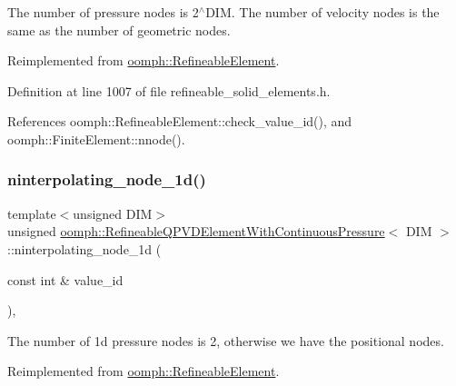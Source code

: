 The number of pressure nodes is 2$^\wedge$\+D\+IM. The number of velocity nodes is the same as the number of geometric nodes. 



Reimplemented from \hyperlink{classoomph_1_1RefineableElement_a8b1b5031b55141567ba24913a21534f4}{oomph\+::\+Refineable\+Element}.



Definition at line 1007 of file refineable\+\_\+solid\+\_\+elements.\+h.



References oomph\+::\+Refineable\+Element\+::check\+\_\+value\+\_\+id(), and oomph\+::\+Finite\+Element\+::nnode().

\mbox{\label{classoomph_1_1RefineableQPVDElementWithContinuousPressure_a9b38f35f3251638b00e5b095f0294e07}} 
\subsubsection{\texorpdfstring{ninterpolating\+\_\+node\+\_\+1d()}{ninterpolating\_node\_1d()}}
{\footnotesize\ttfamily template$<$unsigned D\+IM$>$ \\
unsigned \hyperlink{classoomph_1_1RefineableQPVDElementWithContinuousPressure}{oomph\+::\+Refineable\+Q\+P\+V\+D\+Element\+With\+Continuous\+Pressure}$<$ D\+IM $>$\+::ninterpolating\+\_\+node\+\_\+1d (\begin{DoxyParamCaption}\item[{const int \&}]{value\+\_\+id }\end{DoxyParamCaption})\hspace{0.3cm}{\ttfamily [inline]}, {\ttfamily [virtual]}}



The number of 1d pressure nodes is 2, otherwise we have the positional nodes. 



Reimplemented from \hyperlink{classoomph_1_1RefineableElement_a850180084aaf164550b4f4978b42cda7}{oomph\+::\+Refineable\+Element}.



